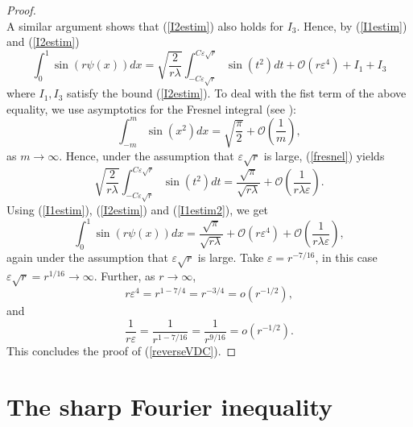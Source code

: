 \documentclass{amsart}
\numberwithin{equation}{section}
\begin{document}
\begin{proof}
\begin{equation}
\end{equation}
A similar argument shows that (\ref{I2estim}) also holds for $I_3$.
Hence, by (\ref{I1estim}) and (\ref{I2estim})
\begin{equation}
    \nonumber
    \int_0^1\sin(r\psi(x))dx=\sqrt{\frac{2}{r\lambda}}\int_{-C\varepsilon\sqrt{r}}^{C\varepsilon\sqrt{r}}\sin(t^2)dt+\mathcal{O}(r\varepsilon^4)+I_1+I_3
\end{equation}
where $I_1,I_3$ satisfy the bound (\ref{I2estim}).
To deal with the fist term of the above equality, we use asymptotics for the Fresnel integral (see \cite[Chapter 7.3]{AS}):
\begin{equation}
    \label{fresnel}
    \int_{-m}^m\sin(x^2)dx=\sqrt{\frac{\pi}{2}}+\mathcal{O}\left(\frac{1}{m}\right),
\end{equation}
as $m\rightarrow\infty$. Hence, under the assumption that $\varepsilon\sqrt{r}$ is large, (\ref{fresnel}) yields
\begin{equation}
    \label{I1estim2}
    \sqrt{\frac{2}{r\lambda}}\int_{-C\varepsilon\sqrt{r}}^{C\varepsilon\sqrt{r}}\sin(t^2)dt=\frac{\sqrt{\pi}}{\sqrt{r\lambda}}+\mathcal{O}\left(\frac{1}{r\lambda \varepsilon}\right).
\end{equation}
Using (\ref{I1estim}), (\ref{I2estim}) and (\ref{I1estim2}), we get
$$
\int_0^1\sin(r\psi(x))dx=\frac{\sqrt{\pi}}{\sqrt{r\lambda}}+\mathcal{O}(r\varepsilon^4)+\mathcal{O}\left(\frac{1}{r\lambda \varepsilon}\right),
$$
again under the assumption that $\varepsilon\sqrt{r}$ is large. Take $\varepsilon=r^{-7/16}$, in this case $\varepsilon\sqrt{r}=r^{1/16}\rightarrow\infty$. Further, as $r\rightarrow\infty$,
$$
r\varepsilon^4=r^{1-7/4}=r^{-3/4}=o(r^{-1/2}),
$$
and
$$
\frac{1}{r\varepsilon}=\frac{1}{r^{1-7/16}}=\frac{1}{r^{9/16}}=o(r^{-1/2}).
$$
This concludes the proof of (\ref{reverseVDC}).
\end{proof}


\section{The sharp Fourier inequality}
\end{document}
